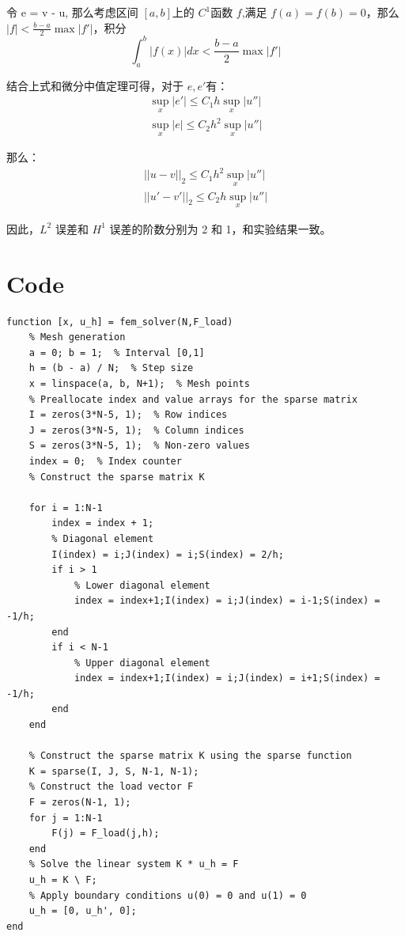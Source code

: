 \documentclass[11pt]{ctexart}
\begin{document}
令 e = v - u, 那么考虑区间 $ [a,b] $上的 $ C^1 $函数 $ f $,满足 $ f(a) = f(b) = 0 $，那么 $ |f|<\frac{b-a}{2}\max|f'| $，积分
\begin{equation}
	\int_a^b |f(x)| dx < \frac{b-a}{2}\max|f'|
\end{equation}

结合上式和微分中值定理可得，对于 $ e,e' $有：
\begin{equation}
	\begin{aligned}
		\sup_x|e'| \le C_1h\sup_x|u''|\\
		\sup_x|e| \le C_2h^2\sup_x|u''|
	\end{aligned}
\end{equation}

那么：
\begin{equation}
	\begin{aligned}
		||u-v||_2 \le C_1h^2\sup_x|u''|\\
		||u'-v'||_2 \le C_2h\sup_x|u''|
	\end{aligned}
\end{equation}

因此，$ L^2 $ 误差和 $ H^1 $ 误差的阶数分别为 2 和 1，和实验结果一致。

\appendix
\section{Code}

\begin{lstlisting}[caption={FEM Solver}]
function [x, u_h] = fem_solver(N,F_load)
    % Mesh generation
    a = 0; b = 1;  % Interval [0,1]
    h = (b - a) / N;  % Step size
    x = linspace(a, b, N+1);  % Mesh points
    % Preallocate index and value arrays for the sparse matrix
    I = zeros(3*N-5, 1);  % Row indices
    J = zeros(3*N-5, 1);  % Column indices
    S = zeros(3*N-5, 1);  % Non-zero values
    index = 0;  % Index counter
    % Construct the sparse matrix K

    for i = 1:N-1
        index = index + 1;
		% Diagonal element
        I(index) = i;J(index) = i;S(index) = 2/h; 
        if i > 1
			% Lower diagonal element
            index = index+1;I(index) = i;J(index) = i-1;S(index) = -1/h;  
        end
        if i < N-1
			% Upper diagonal element
            index = index+1;I(index) = i;J(index) = i+1;S(index) = -1/h;  
        end
    end

    % Construct the sparse matrix K using the sparse function
    K = sparse(I, J, S, N-1, N-1);
    % Construct the load vector F
    F = zeros(N-1, 1);
    for j = 1:N-1
        F(j) = F_load(j,h);
    end
    % Solve the linear system K * u_h = F
    u_h = K \ F;
    % Apply boundary conditions u(0) = 0 and u(1) = 0
    u_h = [0, u_h', 0];
end
\end{lstlisting}
\end{document}
